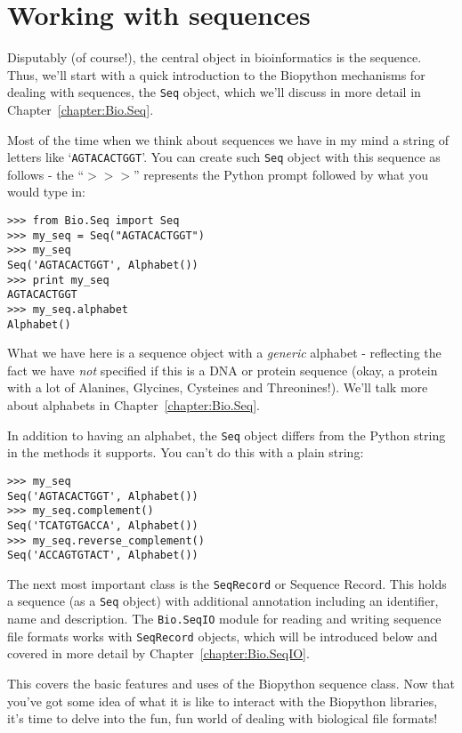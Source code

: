 \documentclass{report}
\begin{document}
\section{Working with sequences}
\label{sec:sequences}

Disputably (of course!), the central object in bioinformatics is the sequence. Thus, we'll start with a quick introduction to the Biopython mechanisms for dealing with sequences, the \verb|Seq| object, which we'll discuss in more detail in Chapter~\ref{chapter:Bio.Seq}.

Most of the time when we think about sequences we have in my mind a string of letters like `\verb|AGTACACTGGT|'. You can create such \verb|Seq| object with this sequence as follows - the ``$>>>$'' represents the Python prompt followed by what you would type in:

\begin{verbatim}
>>> from Bio.Seq import Seq
>>> my_seq = Seq("AGTACACTGGT")
>>> my_seq
Seq('AGTACACTGGT', Alphabet())
>>> print my_seq
AGTACACTGGT
>>> my_seq.alphabet
Alphabet()
\end{verbatim}

What we have here is a sequence object with a \emph{generic} alphabet - reflecting the fact we have \emph{not} specified if this is a DNA or protein sequence (okay, a protein with a lot of Alanines, Glycines, Cysteines and Threonines!).  We'll talk more about alphabets in Chapter~\ref{chapter:Bio.Seq}.

In addition to having an alphabet, the \verb|Seq| object differs from the Python string in the methods it supports.  You can't do this with a plain string:

\begin{verbatim}
>>> my_seq
Seq('AGTACACTGGT', Alphabet())
>>> my_seq.complement()
Seq('TCATGTGACCA', Alphabet())
>>> my_seq.reverse_complement()
Seq('ACCAGTGTACT', Alphabet())
\end{verbatim}

The next most important class is the \verb|SeqRecord| or Sequence Record.  This holds a sequence (as a \verb|Seq| object) with additional annotation including an identifier, name and description.  The \verb|Bio.SeqIO| module for reading and writing sequence file formats works with \verb|SeqRecord| objects, which will be introduced below and covered in more detail by Chapter~\ref{chapter:Bio.SeqIO}.

This covers the basic features and uses of the Biopython sequence class.
Now that you've got some idea of what it is like to interact with the Biopython libraries, it's time to delve into the fun, fun world of dealing with biological file formats!
\end{document}

